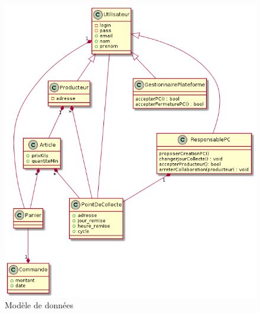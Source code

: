 \begin{figure}
\includegraphics[width=\textwidth]{"img/DiagrammeUML"}
\caption{Modèle de données}
\end{figure}



